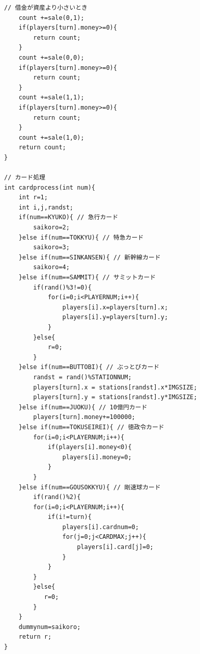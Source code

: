 \documentclass[a4j]{jarticle}
\begin{document}
\begin{lstlisting}[basicstyle=\ttfamily\footnotesize, frame=single,label=code2,caption=game.c]
    // 借金が資産より小さいとき
    count +=sale(0,1);
    if(players[turn].money>=0){
        return count;
    }
    count +=sale(0,0);
    if(players[turn].money>=0){
        return count;
    }
    count +=sale(1,1);
    if(players[turn].money>=0){
        return count;
    }
    count +=sale(1,0);
    return count;
}

// カード処理
int cardprocess(int num){
    int r=1;
    int i,j,randst;
    if(num==KYUKO){ // 急行カード
        saikoro=2;
    }else if(num==TOKKYU){ // 特急カード
        saikoro=3;
    }else if(num==SINKANSEN){ // 新幹線カード
        saikoro=4;
    }else if(num==SAMMIT){ // サミットカード
        if(rand()%3!=0){
            for(i=0;i<PLAYERNUM;i++){
                players[i].x=players[turn].x;
                players[i].y=players[turn].y;
            }
        }else{
            r=0;
        }
    }else if(num==BUTTOBI){ // ぶっとびカード
        randst = rand()%STATIONNUM;
        players[turn].x = stations[randst].x*IMGSIZE;
        players[turn].y = stations[randst].y*IMGSIZE;
    }else if(num==JUOKU){ // 10億円カード
        players[turn].money+=100000;
    }else if(num==TOKUSEIREI){ // 徳政令カード
        for(i=0;i<PLAYERNUM;i++){
            if(players[i].money<0){
                players[i].money=0;
            }
        }
    }else if(num==GOUSOKKYU){ // 剛速球カード
        if(rand()%2){
        for(i=0;i<PLAYERNUM;i++){
            if(i!=turn){
                players[i].cardnum=0;
                for(j=0;j<CARDMAX;j++){
                    players[i].card[j]=0;
                }
            }
        }
        }else{
           r=0; 
        }        
    }
    dummynum=saikoro;
    return r;
}


\end{lstlisting}
\end{document}
